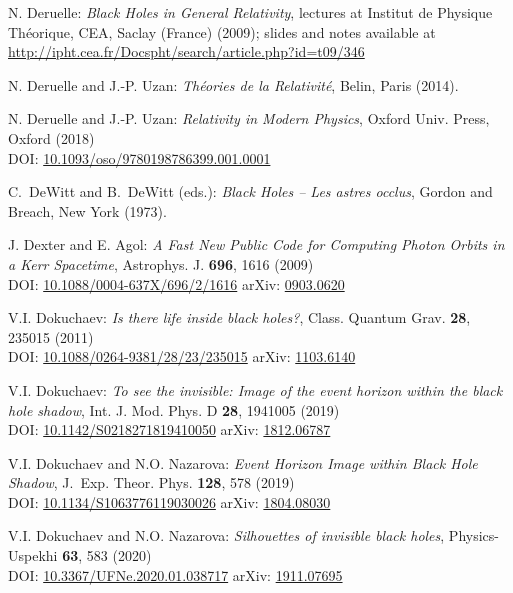 \begin{thebibliography}{123}
N. Deruelle: {\em Black Holes in General Relativity}, lectures at
Institut de Physique Théorique, CEA, Saclay (France) (2009); slides and notes
available at \\
\url{http://ipht.cea.fr/Docspht/search/article.php?id=t09/346}

N. Deruelle and J.-P. Uzan: {\em Th\'eories de la Relativit\'e},
Belin, Paris (2014).

N. Deruelle and J.-P. Uzan: {\em Relativity in Modern Physics},
Oxford Univ. Press, Oxford (2018)\\
DOI: \href{https://doi.org/10.1093/oso/9780198786399.001.0001}{10.1093/oso/9780198786399.001.0001}

C.~DeWitt and B.~DeWitt (eds.):
{\em Black Holes -- Les astres occlus},
Gordon and Breach, New York (1973).

J. Dexter and E. Agol:
{\em A Fast New Public Code for Computing Photon Orbits in a Kerr Spacetime},
Astrophys. J. {\bf 696}, 1616 (2009)\\
DOI: \href{https://doi.org/10.1088/0004-637X/696/2/1616}{10.1088/0004-637X/696/2/1616}\hfill
arXiv: \href{https://arxiv.org/abs/0903.0620}{0903.0620}

V.I. Dokuchaev: {\em Is there life inside black holes?},
Class. Quantum Grav. {\bf 28}, 235015 (2011)\\
DOI: \href{https://doi.org/10.1088/0264-9381/28/23/235015}{10.1088/0264-9381/28/23/235015}\hfill
arXiv: \href{https://arxiv.org/abs/1103.6140}{1103.6140}

V.I. Dokuchaev: {\em To see the invisible: Image of the event horizon within the black hole shadow},
Int. J. Mod. Phys. D {\bf 28}, 1941005 (2019)\\
DOI: \href{https://doi.org/10.1142/S0218271819410050}{10.1142/S0218271819410050}\hfill
arXiv: \href{https://arxiv.org/abs/1812.06787}{1812.06787}

V.I. Dokuchaev and N.O. Nazarova: {\em Event Horizon Image within Black Hole Shadow},
J.~Exp. Theor. Phys. {\bf 128}, 578 (2019)\\
DOI: \href{https://doi.org/10.1134/S1063776119030026}{10.1134/S1063776119030026}\hfill
arXiv: \href{https://arxiv.org/abs/1804.08030}{1804.08030}

V.I. Dokuchaev and N.O. Nazarova: {\em Silhouettes of invisible black holes},
Physics-Uspekhi {\bf 63}, 583 (2020)\\
DOI: \href{https://doi.org/10.3367/UFNe.2020.01.038717}{10.3367/UFNe.2020.01.038717}\hfill
arXiv: \href{https://arxiv.org/abs/1911.07695}{1911.07695}


\end{thebibliography}
